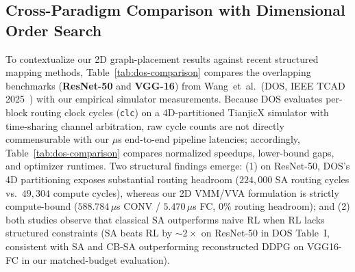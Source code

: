 \documentclass[10pt,conference]{IEEEtran}
\begin{document}
\subsection{Cross-Paradigm Comparison with Dimensional Order Search}
To contextualize our 2D graph-placement results against recent structured mapping methods, Table~\ref{tab:dos-comparison} compares the overlapping benchmarks (\textbf{ResNet-50} and \textbf{VGG-16}) from Wang~et~al.\ (DOS, IEEE TCAD 2025~\cite{wang2025dos}) with our empirical simulator measurements. Because DOS evaluates per-block routing clock cycles (\texttt{clc}) on a 4D-partitioned TianjicX simulator with time-sharing channel arbitration, raw cycle counts are not directly commensurable with our $\mu$s end-to-end pipeline latencies; accordingly, Table~\ref{tab:dos-comparison} compares normalized speedups, lower-bound gaps, and optimizer runtimes. Two structural findings emerge: (1) on ResNet-50, DOS's 4D partitioning exposes substantial routing headroom ($224,000$ SA routing cycles vs.\ $49,304$ compute cycles), whereas our 2D VMM/VVA formulation is strictly compute-bound ($588.784\,\mu$s CONV / $5.470\,\mu$s FC, $0\%$ routing headroom); and (2) both studies observe that classical SA outperforms naive RL when RL lacks structured constraints (SA beats RL by ${\sim}2{\times}$ on ResNet-50 in DOS Table~I, consistent with SA and CB-SA outperforming reconstructed DDPG on VGG16-FC in our matched-budget evaluation).
\end{document}
